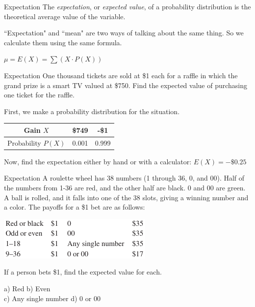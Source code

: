 \documentclass[t, aspectratio=169]{beamer}
\newcommand{\?}{\stackrel{?}{=}}
\begin{document}
	\begin{frame}{Expectation}
		The \textit{expectation}, or \textit{expected value}, of a probability distribution is the theoretical average value of the variable. \pause
		
		``Expectation" and ``mean" are two ways of talking about the same thing. So we calculate them using the same formula. \pause
		
		$\mu = E(X) = \sum (X \cdot P(X))$
	\end{frame}

	\begin{frame}{Expectation}
		One thousand tickets are sold at \$1 each for a raffle in which the grand prize is a smart TV valued at \$750. Find the expected value of purchasing one ticket for the raffle. \pause
		
		First, we make a probability distribution for the situation.
		
		\begin{tabular}{c|cc}
			Gain $X$ & \$749 & -\$1 \\ \hline
			Probability $P(X)$ & 0.001 & 0.999
		\end{tabular} \pause
		
		Now, find the expectation either by hand or with a calculator: $E(X) = -\$0.25$
	\end{frame}

	\begin{frame}{Expectation}
		A roulette wheel has 38 numbers (1 through 36, 0, and 00). Half of the numbers from 1-36 are red, and the other half are black. 0 and 00 are green. A ball is rolled, and it falls into one of the 38 slots, giving a winning number and a color. The payoffs for a \$1 bet are as follows:
		
		\includegraphics[width=3in]{roulette.png}
		
		If a person bets \$1, find the expected value for each.
		
		a) Red  b) Even \\ c) Any single number  d) 0 or 00
	\end{frame}
\end{document}
